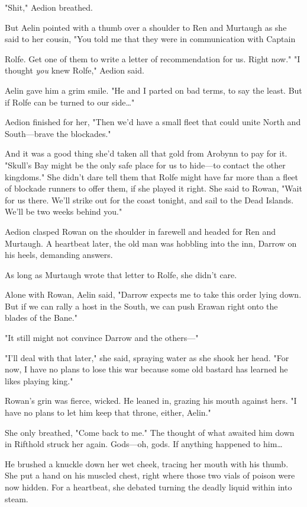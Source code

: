 "Shit," Aedion breathed.

But Aelin pointed with a thumb over a shoulder to Ren and Murtaugh as she said to her cousin, "You told me that they were in communication with Captain

Rolfe. Get one of them to write a letter of recommendation for us. Right now." "I thought \emph{you} knew Rolfe," Aedion said.

Aelin gave him a grim smile. "He and I parted on  bad terms, to say the least. But if Rolfe can be turned to our side\ldots"

Aedion finished for her, "Then we'd have a small fleet that could unite North and South---brave the blockades."

And it was a good thing she'd taken all that gold from Arobynn to pay for it. "Skull's Bay might be the only safe place for us to hide---to contact the other kingdoms." She didn't dare tell them that Rolfe might have far more than a fleet of blockade runners to offer them, if she played it right. She said to Rowan, "Wait for us there. We'll strike out for the coast tonight, and sail to the Dead Islands. We'll be two weeks behind you."

Aedion clasped Rowan on the shoulder in farewell and headed for Ren and Murtaugh. A heartbeat later, the old man was hobbling into the inn, Darrow on his heels, demanding answers.

As long as Murtaugh wrote that letter to Rolfe, she didn't care.

Alone with Rowan, Aelin said, "Darrow expects me to take this order lying down. But if we can rally a host in the South, we can push Erawan right onto the blades of the Bane."

"It still might not convince Darrow and the others---"

"I'll deal with that later," she said, spraying water as she shook her head. "For now, I have no plans to lose this war because some old bastard has learned he likes playing king."

Rowan's grin was fierce, wicked. He leaned in, grazing his mouth against hers. "I have no plans to let him keep that throne, either, Aelin."

She only breathed, "Come back to me." The thought of what awaited him down in Rifthold struck her again. Gods---oh, gods. If anything happened to him\ldots{}

He brushed a knuckle down her wet cheek, tracing her mouth with his thumb. She put a hand on his muscled chest, right where those two vials of poison were now hidden. For a heartbeat, she debated turning the deadly liquid within into steam.

